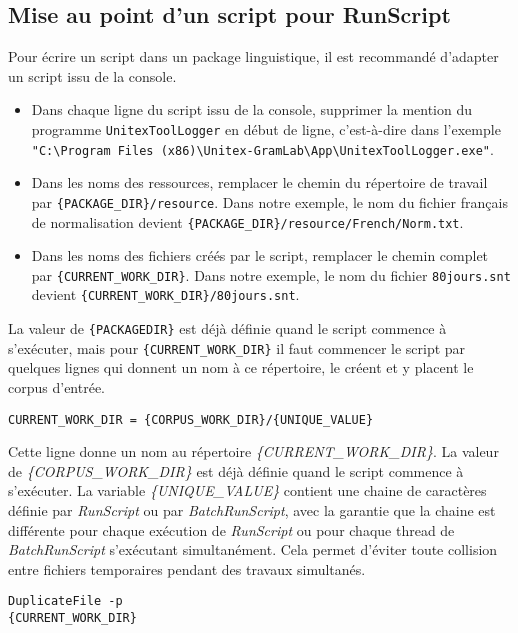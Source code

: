 \subsection{Mise au point d'un script pour RunScript}
\label{section-script-for-runscript}
Pour écrire un script dans un package linguistique, il est recommandé d'adapter un script issu
de la console.

\begin{itemize}
\item Dans chaque ligne du script issu de la console, supprimer la mention du programme
\verb$UnitexToolLogger$ en début de ligne, c'est-à-dire dans l'exemple {\small \verb$"C:\Program Files (x86)\Unitex-GramLab\App\UnitexToolLogger.exe"$}.
\item Dans les noms des ressources, remplacer le chemin du répertoire de travail par \verb${PACKAGE_DIR}/resource$. Dans notre exemple, le nom du fichier français de normalisation devient \verb${PACKAGE_DIR}/resource/French/Norm.txt$.
\item Dans les noms des fichiers créés par le script, remplacer le chemin complet par \verb${CURRENT_WORK_DIR}$. Dans notre exemple, le nom du fichier \verb$80jours.snt$ devient \verb${CURRENT_WORK_DIR}/80jours.snt$.
\end{itemize}

\noindent La valeur de \verb${PACKAGEDIR}$ est déjà définie quand le script commence à s'exécuter, mais pour \verb${CURRENT_WORK_DIR}$ il faut commencer le script par quelques lignes qui donnent un nom à ce répertoire, le créent et y placent le corpus d'entrée.

\begin{verbatim}
CURRENT_WORK_DIR = {CORPUS_WORK_DIR}/{UNIQUE_VALUE}
\end{verbatim}

\noindent Cette ligne donne un nom au répertoire \emph{\{CURRENT\_WORK\_DIR\}}. La valeur de \emph{\{CORPUS\_WORK\_DIR\}} est déjà définie quand le script commence à s'exécuter. La variable \emph{\{UNIQUE\_VALUE\}} contient une chaine de caractères définie par \emph{RunScript} ou par \emph{BatchRunScript}, avec la garantie que la chaine est différente pour chaque exécution de \emph{RunScript} ou pour chaque thread de \emph{BatchRunScript} s’exécutant simultanément. Cela permet d'éviter toute collision entre fichiers temporaires pendant des travaux simultanés.

\begin{verbatim}
DuplicateFile -p 
{CURRENT_WORK_DIR}
\end{verbatim}

